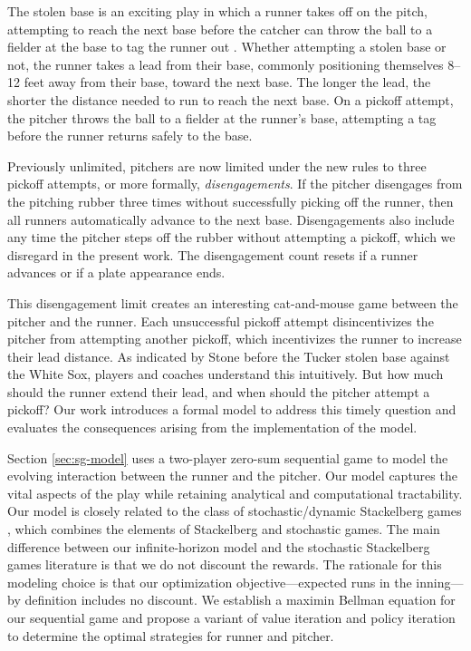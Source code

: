\documentclass[opre,dblanonrev]{informs4}
\begin{document}
    The stolen base is an exciting play in which a runner takes off on the pitch, attempting to reach the next base before the catcher can throw the ball to a fielder at the base to tag the runner out \citep{mlb_baseball_2026}. Whether attempting a stolen base or not, the runner takes a lead from their base, commonly positioning themselves 8--12 feet away from their base, toward the next base. The longer the lead, the shorter the distance needed to run to reach the next base. On a pickoff attempt, the pitcher throws the ball to a fielder at the runner's base, attempting a tag before the runner returns safely to the base.

    Previously unlimited, pitchers are now limited under the new rules to three pickoff attempts, or more formally, {\it disengagements}. If the pitcher disengages from the pitching rubber three times without successfully picking off the runner, then all runners automatically advance to the next base. Disengagements also include any time the pitcher steps off the rubber without attempting a pickoff, which we disregard in the present work. The disengagement count resets if a runner advances or if a plate appearance ends.

    This disengagement limit creates an interesting cat-and-mouse game between the pitcher and the runner. Each unsuccessful pickoff attempt disincentivizes the pitcher from attempting another pickoff, which incentivizes the runner to increase their lead distance. As indicated by Stone before the Tucker stolen base against the White Sox, players and coaches understand this intuitively. But how much should the runner extend their lead, and when should the pitcher attempt a pickoff? Our work introduces a formal model to address this timely question and evaluates the consequences arising from the implementation of the model.
    
    Section \ref{sec:sg-model} uses a two-player zero-sum sequential game to model the evolving interaction between the runner and the pitcher.  Our model captures the vital aspects of the play while retaining analytical and computational tractability. Our model is closely related to the class of stochastic/dynamic Stackelberg games \citep{goktas_zero-sum_2022,li_review_2017,lopez_stationary_2023,vasal_sequential_2022,vorobeychik_computing_2012}, which combines the elements of Stackelberg and stochastic games. The main difference between our infinite-horizon model and the stochastic Stackelberg games literature is that we do not discount the rewards. The rationale for this modeling choice is that our optimization objective---expected runs in the inning---by definition includes no discount. We establish a maximin Bellman equation for our sequential game and propose a variant of value iteration and policy iteration to determine the optimal strategies for runner and pitcher.
\end{document}

